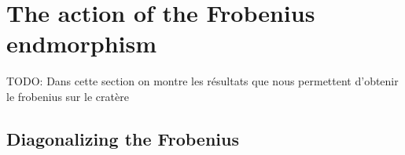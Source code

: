 \documentclass{lms}
\newcommand{\todo}[1]{{\color{red}TODO: #1}}
\newtheorem{prop}[thm]{Proposition}
\begin{document}

\section{The action of the Frobenius endmorphism}
\label{sec:acti-frob-endm}
\todo{Dans cette section on montre les résultats que nous permettent d'obtenir le frobenius sur le cratère}


% 
% 
% 

\subsection{Diagonalizing the Frobenius}
\end{document}
